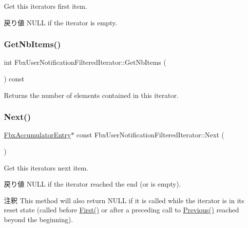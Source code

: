 Get this iterator\textquotesingle{}s first item. \begin{DoxyReturn}{戻り値}
N\+U\+LL if the iterator is empty. 
\end{DoxyReturn}
\mbox{\label{class_fbx_user_notification_filtered_iterator_a66548434b844f1099637aa71eb485f9e}} 
\subsubsection{\texorpdfstring{Get\+Nb\+Items()}{GetNbItems()}}
{\footnotesize\ttfamily int Fbx\+User\+Notification\+Filtered\+Iterator\+::\+Get\+Nb\+Items (\begin{DoxyParamCaption}{ }\end{DoxyParamCaption}) const}



Returns the number of elements contained in this iterator. 

\mbox{\label{class_fbx_user_notification_filtered_iterator_a52a38aed0f08e19410e1f45f0eba0115}} 
\subsubsection{\texorpdfstring{Next()}{Next()}}
{\footnotesize\ttfamily \hyperlink{class_fbx_accumulator_entry}{Fbx\+Accumulator\+Entry}$\ast$ const Fbx\+User\+Notification\+Filtered\+Iterator\+::\+Next (\begin{DoxyParamCaption}{ }\end{DoxyParamCaption})}

Get this iterator\textquotesingle{}s next item. \begin{DoxyReturn}{戻り値}
N\+U\+LL if the iterator reached the end (or is empty). 
\end{DoxyReturn}
\begin{DoxyRemark}{注釈}
This method will also return N\+U\+LL if it is called while the iterator is in its reset state (called before \hyperlink{class_fbx_user_notification_filtered_iterator_a61fc433ba00db459bac761a49e1121a2}{First()} or after a preceding call to \hyperlink{class_fbx_user_notification_filtered_iterator_a6f53e9356bb96d31bcf1a9fbb342533a}{Previous()} reached beyond the beginning). 
\end{DoxyRemark}
\mbox{\label{class_fbx_user_notification_filtered_iterator_a6f53e9356bb96d31bcf1a9fbb342533a}} 

